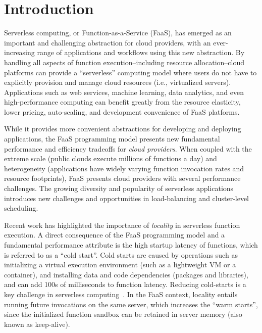 \section{Introduction}

Serverless computing, or Function-as-a-Service (FaaS), has emerged as an important and challenging abstraction for cloud providers, with an ever-increasing range of applications and workflows using this new abstraction. 
%
By handling all aspects of function execution--including resource allocation--cloud platforms can provide a ``serverless'' computing model where users do not have to explicitly provision and manage cloud resources (i.e., virtualized servers). 
Applications such as web services, machine learning, data analytics, and even high-performance computing can benefit greatly from the resource elasticity, lower pricing, auto-scaling, and development convenience of FaaS platforms.

While it provides more convenient abstractions for developing and deploying applications, the FaaS programming model presents new fundamental performance and efficiency tradeoffs for \emph{cloud providers}. 
When coupled with the extreme scale (public clouds execute millions of functions a day) and heterogeneity (applications have widely varying function invocation rates and resource footprints), FaaS presents cloud providers with several performance challenges.
The growing diversity and popularity of serverless applications introduces new challenges and opportunities in load-balancing and cluster-level scheduling.  


Recent work has highlighted the importance of \emph{locality} in serverless function execution.
A direct consequence of the FaaS programming model and a fundamental performance attribute is the high startup latency of functions, which is referred to as a ``cold start''. 
Cold starts are caused by operations such as initializing a virtual execution environment (such as a lightweight VM or a container), and installing data and code dependencies (packages and libraries), and can add 100s of milliseconds to function latency.
Reducing cold-starts is a key challenge in serverless computing~\cite{vanEyk:2018:ICPE:PerformanceChallenges}. 
In the FaaS context, locality entails running future invocations on the same server, which increases the ``warm starts'', since the initialized function sandbox can be retained in server memory (also known as keep-alive).



